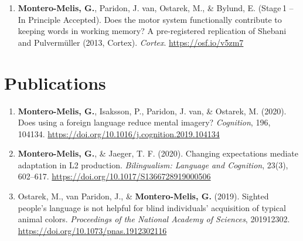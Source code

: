 \documentclass[margin, 11pt]{res} %
\begin{document}
\begin{resume}


\begin{enumerate}

	\item \textbf{Montero-Melis, G.}, Paridon, J. van, Ostarek, M., \& Bylund, E. (Stage\,1 -- In Principle Accepted). Does the motor system functionally contribute to keeping words in working memory? A pre-registered replication of Shebani and Pulvermüller (2013, Cortex). \emph{Cortex}. \url{https://osf.io/v5zm7}

\end{enumerate}


\section{\sc Publications}



\begin{enumerate}

	\item \textbf{Montero-Melis, G.}, Isaksson, P., Paridon, J. van, \& Ostarek, M. (2020). Does using a foreign language reduce mental imagery? \emph{Cognition}, 196, 104134. \url{https://doi.org/10.1016/j.cognition.2019.104134}

	\item \textbf{Montero-Melis, G.}, \& Jaeger, T. F. (2020). Changing expectations mediate adaptation in L2 production. \emph{Bilingualism: Language and Cognition}, 23(3), 602–617. \url{https://doi.org/10.1017/S1366728919000506}

	\item Ostarek, M., van Paridon, J., \& \textbf{Montero-Melis, G.} (2019). Sighted people’s language is not helpful for blind individuals’ acquisition of typical animal colors. \emph{Proceedings of the National Academy of Sciences}, 201912302. \url{https://doi.org/10.1073/pnas.1912302116}


\end{enumerate}
\end{resume}
\end{document}
